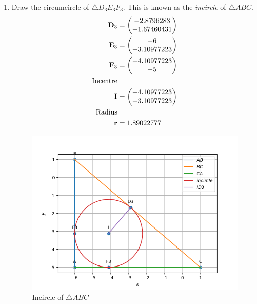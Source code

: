 \documentclass[11pt]{book}
\begin{document}
\begin{enumerate}[label=\thesection.\arabic*.,ref=\thesection.\theenumi]
\item Draw the circumcircle of $\triangle D_3E_3F_3$.  This is known as the {\em incircle} of $\triangle ABC$. \\
\solution 
\begin{align}
    \mathbf{D}_3 &= \begin{pmatrix}-2.8796283  \\ -1.67460431\end{pmatrix} \\
    \mathbf{E}_3 &= \begin{pmatrix}-6  \\ -3.10977223\end{pmatrix} \\
    \mathbf{F}_3 &= \begin{pmatrix}-4.10977223  \\ -5\end{pmatrix} \\
\text{Incentre}\\ 
    \mathbf{I} &= \begin{pmatrix} -4.10977223 \\ -3.10977223\end{pmatrix}\\
\text{Radius}\\
 \mathbf{r} &= 1.89022777
\end{align}
\begin{figure}[H]
\includegraphics[width=\columnwidth]{figs/incircle.png}
\caption{Incircle of $\triangle ABC$}
\label{fig:fig3}
\end{figure}
  

\end{enumerate}
\end{document}
